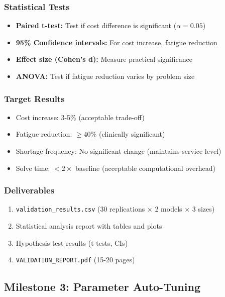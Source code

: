 \documentclass[11pt,letterpaper]{article}
\begin{document}
\subsubsection{Statistical Tests}
\begin{itemize}[leftmargin=*]
    \item \textbf{Paired t-test:} Test if cost difference is significant ($\alpha = 0.05$)
    \item \textbf{95\% Confidence intervals:} For cost increase, fatigue reduction
    \item \textbf{Effect size (Cohen's d):} Measure practical significance
    \item \textbf{ANOVA:} Test if fatigue reduction varies by problem size
\end{itemize}

\subsubsection{Target Results}
\begin{itemize}[leftmargin=*]
    \item Cost increase: 3-5\% (acceptable trade-off)
    \item Fatigue reduction: $\geq 40\%$ (clinically significant)
    \item Shortage frequency: No significant change (maintains service level)
    \item Solve time: $< 2\times$ baseline (acceptable computational overhead)
\end{itemize}

\subsubsection{Deliverables}
\begin{enumerate}[leftmargin=*]
    \item \texttt{validation\_results.csv} (30 replications $\times$ 2 models $\times$ 3 sizes)
    \item Statistical analysis report with tables and plots
    \item Hypothesis test results (t-tests, CIs)
    \item \texttt{VALIDATION\_REPORT.pdf} (15-20 pages)
\end{enumerate}

\subsection{Milestone 3: Parameter Auto-Tuning}
\end{document}
